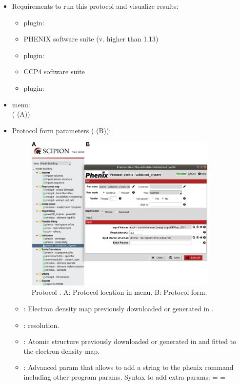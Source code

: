\begin{itemize}
 \item Requirements to run this protocol and visualize results:
    \begin{itemize}
        \item \scipion plugin: 
        \item PHENIX software suite (v. higher than 1.13)
        \item \scipion plugin: 
        \item CCP4 software suite
        \item \scipion plugin: 
    \end{itemize}
 \item \scipion menu:\\
   ( (A))
  
 \item Protocol form parameters ( (B)):
  
    \begin{figure}[H]
     \centering 
     \captionsetup{width=.7\linewidth} 
     \includegraphics[width=0.90\textwidth]{Images_appendix/Fig157}
     \caption{Protocol . A: Protocol location in \scipion menu. B: Protocol form.}
     \label{fig:validationCryoEM_protocol_1}
    \end{figure}
    
    \begin{itemize}
     \item {}: Electron density map previously downloaded or generated in \scipion.
     \item {}:  resolution.
     \item {}: Atomic structure previously downloaded or generated in \scipion and fitted to the electron density map.
     \item {}: Advanced param that allows to add a string to the phenix command including other  program params. Syntax to add extra params:  =   = 
    \end{itemize}
 

\end{itemize}
